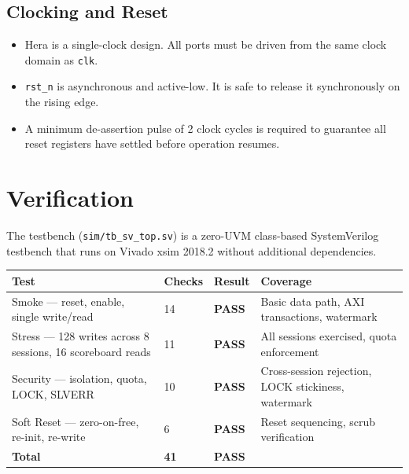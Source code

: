 \documentclass[10pt, a4paper]{article}
\newcommand{\portname}[1]{\texttt{#1}}
\begin{document}
\subsection{Clocking and Reset}

\begin{itemize}
  \item Hera is a single-clock design. All ports must be driven from the
        same clock domain as \portname{clk}.
  \item \portname{rst\_n} is asynchronous and active-low. It is safe to
        release it synchronously on the rising edge.
  \item A minimum de-assertion pulse of 2 clock cycles is required to
        guarantee all reset registers have settled before operation resumes.
\end{itemize}

\section{Verification}

The testbench (\texttt{sim/tb\_sv\_top.sv}) is a zero-UVM class-based
SystemVerilog testbench that runs on Vivado xsim 2018.2 without
additional dependencies.

\renewcommand{\arraystretch}{1.3}
\begin{tabularx}{\linewidth}{L{4.5cm} C{2cm} C{2.5cm} X}
\toprule
\textbf{Test} & \textbf{Checks} & \textbf{Result} & \textbf{Coverage} \\
\midrule
{}
Smoke — reset, enable, single write/read &
  14 & \textbf{\color{green!50!black}PASS} &
  Basic data path, AXI transactions, watermark \\
Stress — 128 writes across 8 sessions, 16 scoreboard reads &
  11 & \textbf{\color{green!50!black}PASS} &
  All sessions exercised, quota enforcement \\
Security — isolation, quota, LOCK, SLVERR &
  10 & \textbf{\color{green!50!black}PASS} &
  Cross-session rejection, LOCK stickiness, watermark \\
Soft Reset — zero-on-free, re-init, re-write &
  6  & \textbf{\color{green!50!black}PASS} &
  Reset sequencing, scrub verification \\
\midrule
\textbf{Total} & \textbf{41} & \textbf{\color{green!50!black}PASS} & \\
\bottomrule
\end{tabularx}
\end{document}
